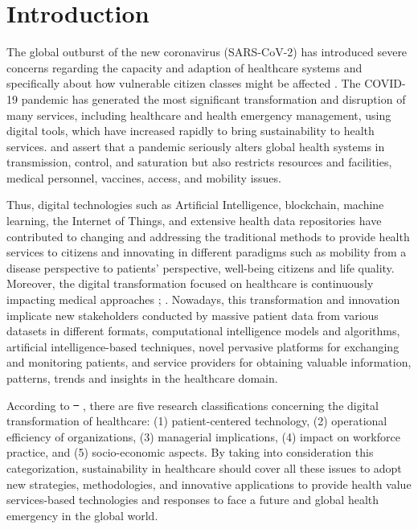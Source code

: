 \documentclass[sustainability,article,submit,pdftex,moreauthors]{Definitions/mdpi}
\providecommand{\DIFadd}[1]{{\protect\color{blue}\uwave{#1}}} %
\providecommand{\DIFdel}[1]{{\protect\color{red}\sout{#1}}}                      %
\providecommand{\DIFaddbegin}{} %
\providecommand{\DIFaddend}{} %
\providecommand{\DIFdelbegin}{} %
\providecommand{\DIFdelend}{} %
\begin{document}

\section{Introduction}

The global outburst of the new coronavirus (SARS-CoV-2) has introduced severe concerns regarding the capacity and adaption of healthcare systems and specifically about how vulnerable citizen classes might be affected \citep{lancet2020covid}. The COVID-19 pandemic has generated the most significant transformation and disruption of many services, including healthcare and health emergency management, using digital tools, which have increased rapidly to bring sustainability to health services. \citet{moazzami2020covid} and \citet{katz2020covid} assert that a pandemic seriously alters global health systems in transmission, control, and saturation but also restricts resources and facilities, medical personnel, vaccines, access, and mobility issues. 

Thus, digital technologies such as Artificial Intelligence, blockchain, machine learning, the Internet of Things, and extensive health data repositories have contributed to changing and addressing the traditional methods to provide health services to citizens and innovating in different paradigms such as mobility from a disease perspective to patients’ perspective, well-being citizens and life quality. Moreover, the digital transformation focused on healthcare is continuously impacting medical approaches \citep{sousa2019decision}; \citep{massaro2021digital}. Nowadays, this transformation and innovation implicate new stakeholders conducted by massive patient data from various datasets in different formats, computational intelligence models and algorithms, artificial intelligence-based techniques, novel pervasive platforms for exchanging and monitoring patients, and service providers for obtaining valuable information, patterns, trends and insights in the healthcare domain.

According to \DIFdelbegin \DIFdel{\mbox{%
\citep{kraus2021digital}}%
}\DIFdelend \DIFaddbegin \DIFadd{\mbox{%
\citet{kraus2021digital}}%
}\DIFaddend , there are five research classifications concerning the digital transformation of healthcare: (1) patient-centered technology, (2) operational efficiency of organizations, (3) managerial implications, (4) impact on workforce practice, and (5) socio-economic aspects. By taking into consideration this categorization, sustainability in healthcare should cover all these issues to adopt new strategies, methodologies, and innovative applications to provide health value services-based technologies and responses to face a future and global health emergency in the global world.
\end{document}
